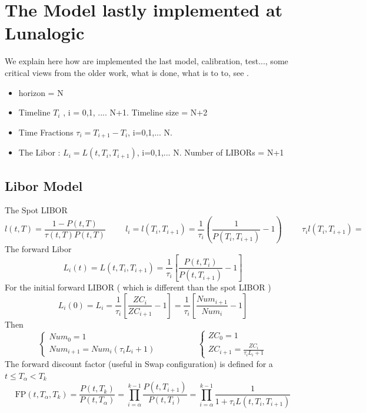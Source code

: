 \documentclass[a4paper,10pt]{article}
\newcommand{\PtT}{P(t,T)}
\newcommand{\LtT}{l(t,T)}
\newcommand{\tautT}{\tau(t,T)}
\newcommand{\li}{l(\Ti,\Tii)}
\newcommand{\Ti}{T_{i}}
\newcommand{\Talpha}{T_{\alpha}}
\newcommand{\Tii}{T_{i+1}}
\newcommand{\Pti}{P(t,T_{i})}
\newcommand{\Ptii}{P(t,T_{i+1})}
\newcommand{\Lti}{L(t,\Ti,\Tii)}
\newcommand{\ZCi}{ZC_{i}}
\newcommand{\ZCii}{ZC_{i+1}}
\newcommand{\Numi}{Num_{i}}
\newcommand{\Numii}{Num_{i+1}}
\begin{document}
\section{The Model lastly implemented at Lunalogic}
We explain here how are implemented the last model, calibration, test..., some critical views from the older work, what is done, what is to to, see \cite{THAI2013}.
\begin{itemize}
 \item horizon  = N
 \item Timeline $T_i$ , i = 0,1, .... N+1. Timeline size = N+2
 \item Time Fractions $\tau_i = \Tii-\Ti$, i=0,1,... N. 
 \item The Libor : $L_i = L(t,T_i,T_{i+1})$, i=0,1,... N. Number of LIBORs = N+1
\end{itemize}

\subsection{Libor Model}
The Spot LIBOR 
\[
\LtT=\frac{1-\PtT}{\tautT \PtT}
\hspace{1cm}
l_i = \li  = \frac{1}{\tau_i}\left( \frac{1}{P(\Ti,\Tii)} - 1 \right)
\hspace{1cm}
\tau_i \li = 
\]
The forward Libor 
\[
L_i(t) = L(t,\Ti,\Tii) = \frac{1}{\tau_i} \left[ \frac{\Pti}{\Ptii} - 1  \right]
\]
For the initial forward LIBOR ( which is different than the spot LIBOR )
\[
L_i(0) = L_i = \frac{1}{\tau_i} \left[ \frac{\ZCi}{\ZCii} - 1  \right] = \frac{1}{\tau_i} \left[ \frac{\Numii}{\Numi} - 1  \right]
\]
Then
\[
\left\{
\begin{array}{l}
Num_0 = 1 \\
\Numii = \Numi(\tau_i L_i +1)
\end{array}
\right.
\hspace{2cm}
\left\{
\begin{array}{l}
ZC_0 = 1 \\
\ZCii = \frac{\ZCi}{\tau_i L_i +1}
\end{array}
\right.
\]
The forward discount factor (useful in Swap configuration) is defined for a $t\leq \Talpha < T_k$
\[
\text{FP}(t,\Talpha,T_k)= \frac{P(t,T_k)}{P(t,\Talpha)}
 = \prod^{k-1}_{i=\alpha} \frac{\Ptii}{\Pti} 
 = \prod^{k-1}_{i=\alpha} \frac{1}{1+\tau_i \Lti }
\]
\end{document}
